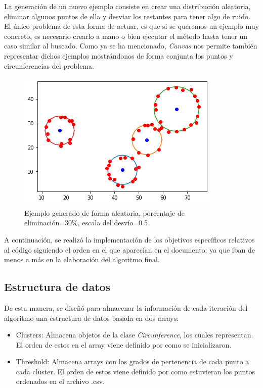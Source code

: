 \documentclass[conference,a4paper]{IEEEtran}
\begin{document}
La generación de un nuevo ejemplo consiste en crear una distribución aleatoria, eliminar algunos puntos de ella y desviar los restantes para tener algo de ruido. El único problema de esta forma de actuar, es que si se queremos un ejemplo muy concreto, es necesario crearlo a mano o bien ejecutar el método hasta tener un caso similar al buscado. Como ya se ha mencionado, \textit{Canvas} nos permite también representar dichos ejemplos mostrándonos de forma conjunta los puntos y circunferencias del problema.\\

\begin{figure}[H]
\centering
\includegraphics[scale=0.8]{EjemploGenerado}
\caption{Ejemplo generado de forma aleatoria, porcentaje de eliminación=30\%, escala del desvío=0.5}
\end{figure}

A continuación, se realizó la implementación de los objetivos específicos relativos al código siguiendo el orden en el que aparecían en el documento; ya que iban de menos a más en la elaboración del algoritmo final.\\

\subsection{Estructura de datos}

De esta manera, se diseñó para almacenar la información de cada iteración del algoritmo una estructura de datos basada en dos arrays: 
\begin{itemize}
	\item Clusters: Almacena objetos de la clase \textit{Circunference}, los cuales representan. El orden de estos en el array viene definido por como se inicializaron.\\
	\item Threshold: Almacena arrays con los grados de pertenencia de cada punto a cada cluster. El orden de estos viene definido por como estuvieran los puntos ordenados en el archivo .csv.
\end{itemize}
\end{document}
